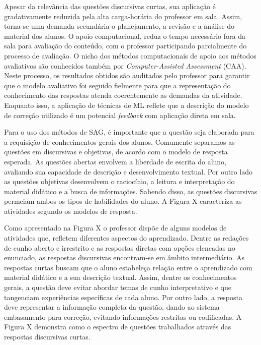Apesar da relevância das questões discursivas curtas, sua aplicação é gradativamente reduzida pela alta carga-horária do professor em sala. Assim, torna-se uma demanda secundária o planejamento, a revisão e a análise do material dos alunos. O apoio computacional, reduz o tempo necessário fora da sala para avaliação do conteúdo, com o professor participando parcialmente do processo de avaliação. O nicho dos métodos computacionais de apoio aos métodos avaliativos são conhecidos também por \textit{Computer-Assisted Assessment} (CAA). Neste processo, os resultados obtidos são auditados pelo professor para garantir que o modelo avaliativo foi seguido fielmente para que a representação do conhecimento das respostas atenda coerentemente as demandas da atividade. Enquanto isso, a aplicação de técnicas de ML reflete que a descrição do modelo de correção utilizado é um potencial \textit{feedback} com aplicação direta em sala.

Para o uso dos métodos de SAG, é importante que a questão seja elaborada para a requisição de conhecimentos gerais dos alunos. Comumente separamos as questões em discursivas e objetivas, de acordo com o modelo de resposta esperada. As questões abertas envolvem a liberdade de escrita do aluno, avaliando sua capacidade de descrição e desenvolvimento textual. Por outro lado as questões objetivas desenvolvem o raciocínio, a leitura e interpretação do material didático e a busca de informações. Sabendo disso, as questões discursivas permeiam ambos os tipos de habilidades do aluno. A Figura X caracteriza as atividades segundo os modelos de resposta.



Como apresentado na Figura X o professor dispõe de alguns modelos de atividades que, refletem diferentes aspectos do aprendizado. Dentre as redações de cunho aberto e irrestrito e as respostas diretas com opções elencadas no enunciado, as respostas discursivas encontram-se em âmbito intermediário. As respostas curtas buscam que o aluno estabeleça relação entre o aprendizado com material didático e a sua descrição textual. Assim, dentre os conhecimentos gerais, a questão deve evitar abordar temas de cunho interpretativo e que tangenciam experiências específicas de cada aluno. Por outro lado, a resposta deve representar a informação completa da questão, dando ao sistema embasamento para correção, evitando informações restritas ou codificadas. A Figura X demonstra como o espectro de questões trabalhados através das respostas discursivas curtas.

